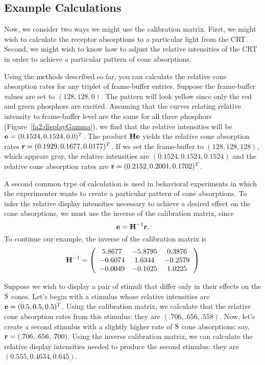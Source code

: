 \subsection*{Example Calculations}
Now, we consider two ways we might use the calibration matrix.  First,
we might wish to calculate the receptor absorptions to a particular
light from the CRT.  Second, we might wish to know how to adjust the
relative intensities of the CRT in order to achieve a particular
pattern of cone absorptions.

Using the methods described so far, you can calculate the relative
cone absorption rates for any triplet of frame-buffer entries.
Suppose the frame-buffer values are set to $(128,128,0)$.  The pattern
will look yellow since only the red and green phosphors are excited.
Assuming that the curves relating relative intensity to frame-buffer
level are the same for all three phosphors
(Figure~\ref{fa2:displayGamma}), we find that the relative intensities
will be $\mbox{$\bf e$} = (0.1524,0.1524,0.0)^T$. The product $\mbox{$\mbox{${\bf H}$}$} \mbox{$\bf e$}$
yields the relative cone absorption rates $\mbox{$\bf r$} =(0.1929, 0.1677,
0.0177)^T$.  If we set the frame-buffer to $(128,128,128)$, which
appears gray, the relative intensities are $(0.1524,0.1524,0.1524)$
and the relative cone absorption rates are $\mbox{$\bf r$} =
(0.2152,0.2001,0.1702)^T$.

A second common type of calculation is used in behavioral experiments
in which the experimenter wants to create a particular pattern of cone
absorptions.  To infer the relative display intensities necessary to
achieve a desired effect on the cone absorptions, we must use the
inverse of the calibration matrix, since
\[
\mbox{$\bf e$} = \mbox{$\mbox{${\bf H}$}$}^{-1} \mbox{$\bf r$}  .
\]
To continue our example, the inverse of the calibration matrix is
\[
\mbox{$\mbox{${\bf H}$}$}^{-1} =
\left (
 \begin{array}{ccc}
    5.8677 &  -5.8795  &  0.3876 \\
   -0.6074 &   1.6344 &  -0.2579 \\
   -0.0049 &  -0.1025 &   1.0225
 \end{array}
\right )
\]

Suppose we wish to display a pair of stimuli that differ only in their
effects on the $\mbox{S}$ cones.  Let's begin with a stimulus whose
relative intensities are $\mbox{$\bf e$} = (0.5,0.5,0.5)^T$.  Using the
calibration matrix, we calculate that the relative cone absorption
rates from this stimulus: they are $(.706, .656, .558)$.  Now, let's
create a second stimulus with a slightly higher rate of $\mbox{S}$ cone
absorptions: say, $\mbox{$\bf r$} = (.706, .656, .700)$.  Using the inverse
calibration matrix, we can calculate the relative display intensities
needed to produce the second stimulus: they are $(0.555, 0.4634,
0.645)$.

